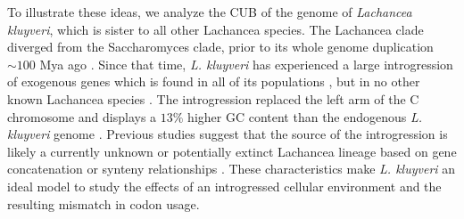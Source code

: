 \documentclass{bmcart}
\newcommand{\kluyveri}{\textit{L. kluyveri}\xspace}
\newcommand{\GC}{GC content\xspace}
\begin{document}
To illustrate these ideas, we analyze the CUB of the genome of \emph{Lachancea kluyveri}, which is sister to all other Lachancea species.
The Lachancea clade diverged from the Saccharomyces clade, prior to its whole genome duplication $\sim 100$ Mya ago \citep{MHM2015,Beimforde2014}.
Since that time, \kluyveri has experienced a large introgression of exogenous genes which is found in all of its populations \citep{friedrich2015}, but in no other known Lachancea species \citep{vakirlis2016}.
The introgression replaced the left arm of the C chromosome and displays a $13 \%$ higher \GC than the endogenous \kluyveri genome \citep{payen2009, friedrich2015}.
Previous studies suggest that the source of the introgression is likely a currently unknown or potentially extinct Lachancea lineage based on gene concatenation or synteny relationships \citep{payen2009, friedrich2015, vakirlis2016, brion2017}.
These characteristics make \kluyveri an ideal model to study the effects of an introgressed cellular environment and the resulting mismatch in codon usage.
\end{document}
